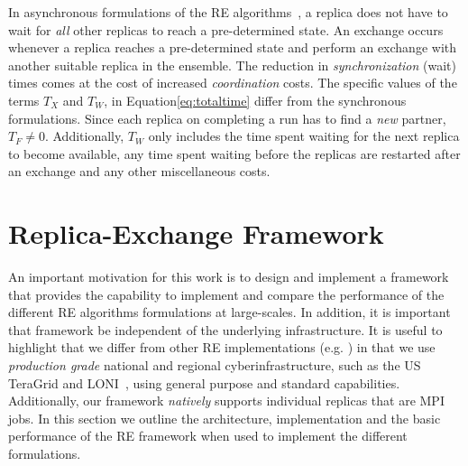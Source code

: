 \documentclass{rspublic}
\newcommand{\jhanote}[1]{ {\textcolor{red} { ***shantenu: #1 }}}
\newcommand{\alnote}[1]{ {\textcolor{blue} { ***andre: #1 }}}
\newcommand{\athotanote}[1]{ {\textcolor{green} { ***athota: #1 }}}
\newcommand{\alnote}[1]{}
\newcommand{\athotanote}[1]{}
\newcommand{\jhanote}[1]{}
\begin{document}
In asynchronous formulations of the RE
algorithms~\citep{parashar_arepex,DBLP:journals/jcc/GallicchioLP08}, a
replica does not have to wait for {\it all} other replicas to reach a
pre-determined state. An exchange occurs whenever a replica reaches a
pre-determined state and perform an exchange with another suitable
replica in the ensemble.  The reduction in {\it synchronization}
(wait) times comes at the cost of increased {\it coordination} costs.
The specific values of the terms $T_{X}$ and $T_W$, in
Equation\ref{eq:totaltime} differ from the synchronous formulations.
Since each replica on completing a run has to find a {\it new}
partner, $T_F \neq 0$.  Additionally, $T_W$ only includes the time
spent waiting for the next replica to become available, any time spent
waiting before the replicas are restarted after an exchange and any
other miscellaneous costs.




\section{Replica-Exchange Framework}\label{repexfw}

An important motivation for this work is to design and implement a
framework that provides the capability to implement and compare the
performance of the different RE algorithms formulations at
large-scales.  In addition, it is important that framework be
independent of the underlying infrastructure.  It is useful to
highlight that we differ from other RE implementations (e.g.
\cite{parashar_arepex}) in that we use {\it production grade}
national and regional cyberinfrastructure, such as the US TeraGrid and
LONI~\citep{LONI_web}, using general purpose and standard
capabilities.  Additionally, our framework {\it natively} supports
individual replicas that are MPI jobs. In this section we outline the
architecture, implementation and the basic performance of the RE
framework when used to implement the different formulations.
\end{document}
